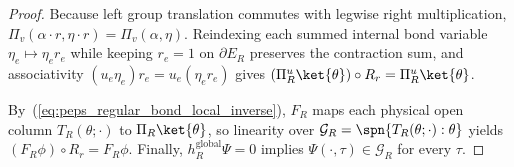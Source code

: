 \begin{proof}\leanok
    Because left group translation commutes with legwise right multiplication,
    $\Pi_v(\alpha\cdot r,\eta\cdot r)=\Pi_v(\alpha,\eta)$. Reindexing each
    summed internal bond variable $\eta_e\mapsto\eta_e r_e$ while keeping
    $r_e=1$ on $\partial E_R$ preserves the contraction sum, and associativity
    $(u_e\eta_e)r_e=u_e(\eta_e r_e)$ gives
    $(\Pi_R^u\ket{\theta})\circ R_r=\Pi_R^u\ket{\theta}$.

    By~(\ref{eq:peps_regular_bond_local_inverse}), $F_R$ maps each physical
    open column $T_R(\theta;\cdot)$ to $\Pi_R\ket{\theta}$, so linearity over
    $\mathcal G_R=\spn\{T_R(\theta;\cdot):\theta\}$ yields
    $(F_R\phi)\circ R_r=F_R\phi$. Finally, $h_R^{\mathrm{global}}\Psi=0$
    implies $\Psi(\cdot,\tau)\in\mathcal G_R$ for every $\tau$.
\end{proof}
